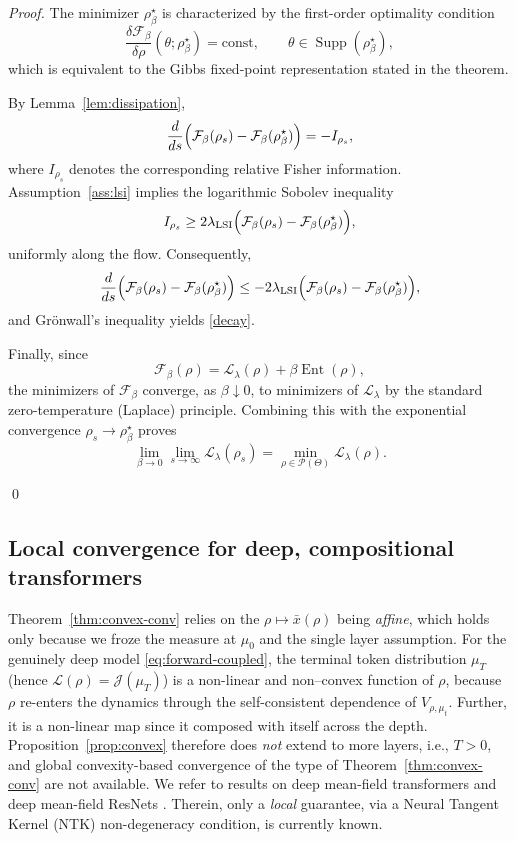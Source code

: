 \documentclass[11pt,a4wide]{article}
\theoremstyle{definition}
\newcommand{\Prob}{\mathcal{P}}
\DeclareMathOperator{\Ent}{Ent}
\DeclareMathOperator{\Supp}{Supp}
\begin{document}
\begin{proof}
The minimizer $\rho_\beta^\star$ is characterized by the first-order optimality
condition
\[
\frac{\delta\mathcal F_\beta}{\delta\rho}
(\theta;\rho_\beta^\star)
=
\mathrm{const},
\qquad
\theta\in\Supp(\rho_\beta^\star),
\]
which is equivalent to the Gibbs fixed-point representation stated in the
theorem.

By Lemma~\ref{lem:dissipation},
\[
\frac{d}{ds}
\Bigl(
\mathcal F_\beta(\rho_s)
-
\mathcal F_\beta(\rho_\beta^\star)
\Bigr)
=
-
I_{\rho_s},
\]
where $I_{\rho_s}$ denotes the corresponding relative Fisher information.
Assumption~\ref{ass:lsi} implies the logarithmic Sobolev inequality
\[
I_{\rho_s}
\ge
2\lambda_{\mathrm{LSI}}
\Bigl(
\mathcal F_\beta(\rho_s)
-
\mathcal F_\beta(\rho_\beta^\star)
\Bigr),
\]
uniformly along the flow. Consequently,
\[
\frac{d}{ds}
\Bigl(
\mathcal F_\beta(\rho_s)
-
\mathcal F_\beta(\rho_\beta^\star)
\Bigr)
\le
-2\lambda_{\mathrm{LSI}}
\Bigl(
\mathcal F_\beta(\rho_s)
-
\mathcal F_\beta(\rho_\beta^\star)
\Bigr),
\]
and Gr\"onwall's inequality yields
\eqref{decay}.

Finally, since
\[
\mathcal F_\beta(\rho)
=
\mathcal L_\lambda(\rho)
+
\beta\Ent(\rho),
\]
the minimizers of $\mathcal F_\beta$ converge, as $\beta\downarrow0$, to
minimizers of $\mathcal L_\lambda$ by the standard zero-temperature (Laplace)
principle. Combining this with the exponential convergence
$\rho_s\to\rho_\beta^\star$ proves
\[
\lim_{\beta\to0}
\lim_{s\to\infty}
\mathcal L_\lambda(\rho_s)
=
\min_{\rho\in\Prob(\Theta)}
\mathcal L_\lambda(\rho).
\]

\qed
\end{proof}

\subsection{Local convergence for deep, compositional transformers}

Theorem~\ref{thm:convex-conv} relies  on the  $\rho\mapsto\bar x(\rho)$ being \emph{affine}, which holds only because we froze the  measure at $\mu_0$ and the  single layer assumption. For the genuinely deep model \eqref{eq:forward-coupled}, the terminal token distribution $\mu_T$ (hence $\mathcal L(\rho)=\mathcal J(\mu_T)$) is a  non-linear and non--convex function of $\rho$, because $\rho$ re-enters the dynamics through the self-consistent dependence of $V_{\rho,\mu_t}$.  Further, it is a  non-linear map since it composed with itself across the depth. Proposition~\ref{prop:convex} therefore does \emph{not} extend to more layers, i.e., $T>0$,  and global convexity-based convergence of the type of Theorem~\ref{thm:convex-conv} are not available. We refer to results on  deep mean-field transformers \cite{barboni2026training} and deep mean-field ResNets \cite{barboni2024understanding}. Therein,  only a \emph{local} guarantee, via a Neural Tangent Kernel (NTK) non-degeneracy condition, is currently known.
\end{document}
